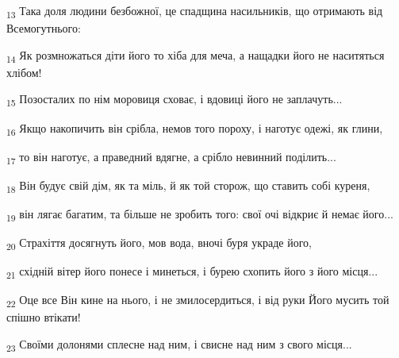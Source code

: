 \begin{tcolorbox}
\textsubscript{13} Така доля людини безбожної, це спадщина насильників, що отримають від Всемогутнього:
\end{tcolorbox}
\begin{tcolorbox}
\textsubscript{14} Як розмножаться діти його то хіба для меча, а нащадки його не наситяться хлібом!
\end{tcolorbox}
\begin{tcolorbox}
\textsubscript{15} Позосталих по нім моровиця сховає, і вдовиці його не заплачуть...
\end{tcolorbox}
\begin{tcolorbox}
\textsubscript{16} Якщо накопичить він срібла, немов того пороху, і наготує одежі, як глини,
\end{tcolorbox}
\begin{tcolorbox}
\textsubscript{17} то він наготує, а праведний вдягне, а срібло невинний поділить...
\end{tcolorbox}
\begin{tcolorbox}
\textsubscript{18} Він будує свій дім, як та міль, й як той сторож, що ставить собі куреня,
\end{tcolorbox}
\begin{tcolorbox}
\textsubscript{19} він лягає багатим, та більше не зробить того: свої очі відкриє й немає його...
\end{tcolorbox}
\begin{tcolorbox}
\textsubscript{20} Страхіття досягнуть його, мов вода, вночі буря украде його,
\end{tcolorbox}
\begin{tcolorbox}
\textsubscript{21} східній вітер його понесе і минеться, і бурею схопить його з його місця...
\end{tcolorbox}
\begin{tcolorbox}
\textsubscript{22} Оце все Він кине на нього, і не змилосердиться, і від руки Його мусить той спішно втікати!
\end{tcolorbox}
\begin{tcolorbox}
\textsubscript{23} Своїми долонями сплесне над ним, і свисне над ним з свого місця...
\end{tcolorbox}
